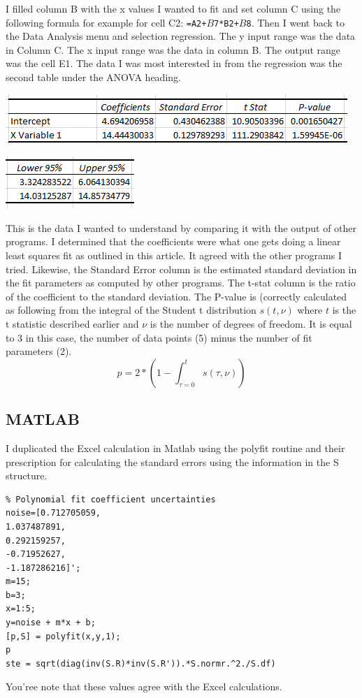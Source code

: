 \documentclass{scrartcl}
\begin{document}
I filled column B with the x values I wanted to fit and set
column C using the following formula for example for
cell C2: \texttt{=A2+$B$7*B2+$B$8}.
Then I went back to the Data Analysis menu and selection regression.
The y input range was the data in Column C. The x input range was
the data in column B. The output range was the cell E1. The
data I was most interested in from the regression was the
second table under the ANOVA heading.

\includegraphics{anova1}

\includegraphics{anova2}

This is the data I wanted to understand by comparing it with the
output of other programs. I determined that the coefficients were
what one gets doing a linear least squares fit as outlined
in this article. It agreed with the other programs I tried.
Likewise, the Standard Error column is the estimated standard
deviation in the fit parameters as computed by other programs.
The t-stat column is the ratio of the coefficient to the
standard deviation. The P-value is (correctly calculated
as following from the integral of the Student t distribution
$s(t,\nu)$ where $t$ is the t statistic described earlier and
$\nu$ is the number of degrees of freedom. It is equal to 3 in
this case, the
number of data points (5) minus the number of
fit parameters (2).
\begin{equation}
p=2*\left(1-\int_{\tau=0}^t s(\tau,\nu)\right)
\end{equation}
\subsection{MATLAB}
I duplicated the Excel calculation in Matlab using the
polyfit routine and their prescription for calculating
the standard errors using the information in the S structure.
\begin{lstlisting}
% Polynomial fit coefficient uncertainties
noise=[0.712705059,
1.037487891,
0.292159257,
-0.71952627,
-1.187286216]';
m=15;
b=3;
x=1:5;
y=noise + m*x + b;
[p,S] = polyfit(x,y,1);
p
ste = sqrt(diag(inv(S.R)*inv(S.R')).*S.normr.^2./S.df)
\end{lstlisting}
You'ree note that these values agree with the Excel calculations.
\end{document}
